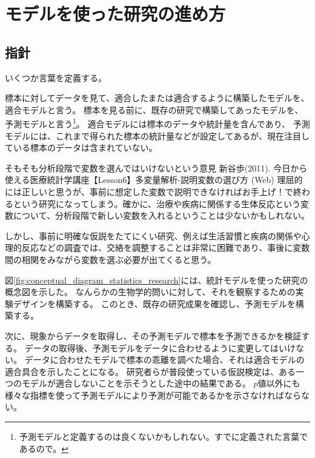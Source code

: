 \chapter{モデルを使った研究の進め方}

\section{指針}
いくつか言葉を定義する。
\begin{defi}
 標本に対してデータを見て、適合したまたは適合するように構築したモデルを、適合モデルと言う。
 標本を見る前に、既存の研究で構築してあったモデルを、予測モデルと言う\footnote{予測モデルと定義するのは良くないかもしれない。すでに定義された言葉であるので。}。
 適合モデルには標本のデータや統計量を含んであり、
 予測モデルには、これまで得られた標本の統計量などが設定してあるが、現在注目している標本のデータは含まれていない。
\end{defi}

そもそも分析段階で変数を選んではいけないという意見
新谷歩(2011). 今日から使える医療統計学講座【Lesson6】多変量解析-説明変数の選び方 (Web)
理屈的には正しいと思うが、事前に想定した変数で説明できなければお手上げ！で終わるという研究になってしまう。確かに、治療や疾病に関係する生体反応という変数について、分析段階で新しい変数を入れるということは少ないかもしれない。

しかし、事前に明確な仮説をたてにくい研究、例えば生活習慣と疾病の関係や心理的反応などの調査では、交絡を調整することは非常に困難であり、事後に変数間の相関をみながら変数を選ぶ必要が出てくると思う。
\fi


図\ref{fig:conceptual_diagram_statistics_research}には、統計モデルを使った研究の概念図を示した。
なんらかの生物学的問いに対して、それを観察するための実験デザインを構築する。
このとき、既存の研究成果を確認し、予測モデルを構築する。

次に、現象からデータを取得し、その予測モデルで標本を予測できるかを検証する。
データの取得後、予測モデルをデータに合わせるように変更してはいけない。
データに合わせたモデルで標本の乖離を調べた場合、それは適合モデルの適合具合を示したことになる。
研究者らが普段使っている仮説検定は、ある一つのモデルが適合しないことを示そうとした途中の結果である。
$p$値以外にも様々な指標を使って予測モデルにより予測が可能であるかを示さなければならない。

